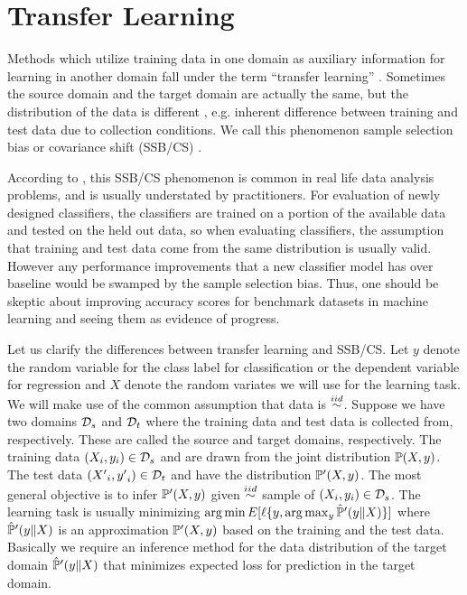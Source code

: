 \documentclass[12pt,oneside,final]{thesis}
\begin{document}
\section[Transfer Learning and Domain Adaptation]{Transfer Learning \label{sec:translearn}}

Methods which utilize training data in one domain  as auxiliary information for  learning  in another domain fall under the term ``transfer learning'' \cite{TransLearnSurvey}. Sometimes the source domain and the target domain are actually the same, but the distribution of the data is different , e.g. inherent difference between training and test data due to collection conditions. We call this phenomenon sample selection bias or covariance shift (SSB/CS) \cite{Zadrozny2004a,TransLearnSurvey}.

According to \cite{Hand2006a}, this SSB/CS phenomenon is common in real life data analysis problems, and is usually understated by practitioners. For evaluation of newly designed classifiers, the classifiers are trained on a portion of the available data and tested on the held out data, so when evaluating classifiers, the assumption that training and test data come from the same distribution is usually valid. However any performance improvements that a new classifier model has over baseline would be swamped  by the sample selection bias. Thus, one should be skeptic about improving accuracy scores for benchmark datasets in machine learning and seeing them as evidence of progress.

Let us clarify the differences between transfer learning  and SSB/CS.  Let $y$ denote the random variable for the class label  for classification or the dependent variable for regression and $X$ denote the random variates we will use for the learning task. We will  make use of  the common assumption that data is $\stackrel{iid}{\sim}$.  
Suppose we have two domains  ${\mathcal{D}}_s$ and ${\mathcal{D}}_t$ where the training data and test data is collected from, respectively. These are called the source and target domains, respectively.
The training data $\left(X_i,y_i\right) \in {\mathcal{D}}_s$ and are drawn from the joint distribution $\mathbb{P}(X,y)$. 
The test data $\left({X'}_i,{y'}_i\right) \in {\mathcal{D}}_t$ and have the distribution $\mathbb{P}'(X,y)$.
The most general objective is to infer $\mathbb{P}'(X,y)$  given $\stackrel{iid}{\sim}$ sample of $\left(X_i,y_i\right) \in {\mathcal{D}}_s$. 
The learning task is usually minimizing  $\arg\min E[\ell\{y, \arg\max_y{\hat{\mathbb{P}}'(y \| X) } \}]$  
where $\hat{\mathbb{P}}'(y \| X)$  is an approximation  $\mathbb{P}'(X,y)$ based on the training and the test data. Basically we require an inference method for the data distribution of the target domain   $\hat{\mathbb{P}}'(y \| X)$ that minimizes expected loss for prediction in the target domain.
\end{document}
